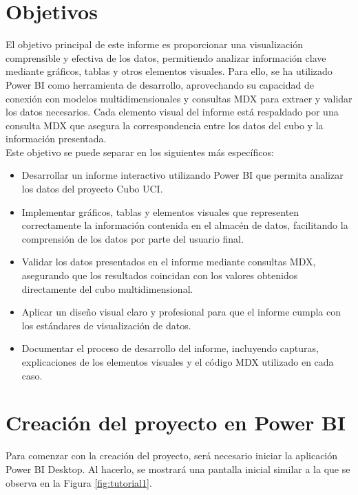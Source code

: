 \documentclass{article}
\begin{document}
\section{Objetivos}
\label{sec:objetivos}

El objetivo principal de este informe es proporcionar una visualización comprensible y efectiva de los datos, permitiendo analizar información clave mediante gráficos, tablas y otros elementos visuales. Para ello, se ha utilizado Power BI como herramienta de desarrollo, aprovechando su capacidad de conexión con modelos multidimensionales y consultas MDX para extraer y validar los datos necesarios. Cada elemento visual del informe está respaldado por una consulta MDX que asegura la correspondencia entre los datos del cubo y la información presentada.
\\

Este objetivo se puede separar en los siguientes más específicos:

\begin{itemize}
	\item Desarrollar un informe interactivo utilizando Power BI que permita analizar los datos del proyecto Cubo UCI.
	\item Implementar gráficos, tablas y elementos visuales que representen correctamente la información contenida en el almacén de datos, facilitando la comprensión de los datos por parte del usuario final.
	\item Validar los datos presentados en el informe mediante consultas MDX, asegurando que los resultados coincidan con los valores obtenidos directamente del cubo multidimensional.
	\item Aplicar un diseño visual claro y profesional para que el informe cumpla con los estándares de visualización de datos.
	\item Documentar el proceso de desarrollo del informe, incluyendo capturas, explicaciones de los elementos visuales y el código MDX utilizado en cada caso.
\end{itemize}



\section{Creación del proyecto en Power BI}
Para comenzar con la creación del proyecto, será necesario iniciar la aplicación Power BI Desktop. Al hacerlo, se mostrará una pantalla inicial similar a la que se observa en la Figura \ref{fig:tutorial1}.
\end{document}

